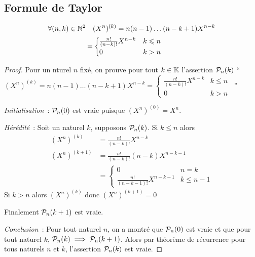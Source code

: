 \subsection{Formule de Taylor}

\begin{lemme}
  \begin{align}
    \forall (n,k) \in \N^2 \quad &(X^n)^{(k)} = n(n-1) \ldots (n-k+1) X^{n-k}\\
    = &\begin{cases}
      \frac{n!}{(n-k)!} X^{n-k} & k \leqslant n \\
      0 & k > n
    \end{cases}
  \end{align}
\end{lemme}
\begin{proof}
  Pour un nturel $n$ fixé, on prouve pour tout $k \in \K$ l'assertion $\P_n(k)$ ``$(X^n)^{(k)} = n(n-1) \ldots (n-k+1) X^{n-k}=
    \begin{cases}
      \frac{n!}{(n-k)!} X^{n-k} & k \leqslant n \\
      0 & k > n
    \end{cases}$~''

    \emph{Initialisation}~: $\P_n(0)$ est vraie puisque $(X^n)^{(0)} = X^n$.

    \emph{Hérédité}~: Soit un naturel $k$, supposons $\P_n(k)$. Si $k \leqslant n$ alors
    \begin{align}
      (X^n)^{(k)} &= \frac{n!}{(n-k)!} X^{n-k} \\
      (X^n)^{(k+1)} &= \frac{n!}{(n-k)!} (n-k) X^{n-k-1} \\
      &=\begin{cases} 0 & n=k \\ \frac{n!}{(n-k-1)!} X^{n-k-1} & k \leqslant n-1 \end{cases}
    \end{align}
    Si $k > n$ alors $(X^n)^{(k)}$ donc $(X^n)^{(k+1)}=0$

    Finalement $\P_n(k+1)$ est vraie.

    \emph{Conclusion}~: Pour tout naturel $n$, on a montré que $\P_n(0)$ est vraie et que pour tout naturel $k$, $\P_n(k) \implies \P_n(k+1)$. Alors par théorème de récurrence pour tous naturels $n$ et $k$, l'assertion $\P_n(k)$ est vraie.
\end{proof}

